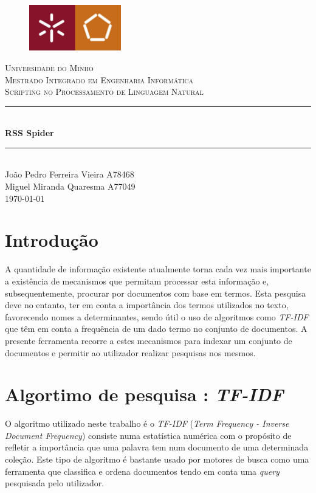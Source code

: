 \documentclass{article}
\newcommand{\titleRule}{
    \rule{\linewidth}{0.5mm} \\ [0.25cm]
}
\begin{document}
\begin{titlepage}
    \center
    \begin{figure}[H]
        \centering
        \includegraphics[width=4cm]{UM_EENG.jpg}
    \end{figure}
    \textsc{\LARGE Universidade do Minho} \\ [1.5cm]
    \textsc{\Large Mestrado Integrado em Engenharia Informática} \\ [0.5cm]
    \textsc{\large Scripting no Processamento de Linguagem Natural} \\ [0.5cm]

    \titleRule
    {\huge \bfseries RSS Spider}
    \titleRule

    João Pedro Ferreira Vieira A78468 \\
    Miguel Miranda Quaresma A77049 \\[0.25cm]

    \today
\end{titlepage}

\tableofcontents

\newpage

\section{Introdução}

A quantidade de informação existente atualmente torna cada vez mais importante a existência de mecanismos que permitam processar
esta informação e, subsequentemente, procurar por documentos com base em termos. Esta pesquisa deve no entanto, ter em conta a
importância dos termos utilizados no texto, favorecendo nomes a determinantes, sendo útil o uso de algoritmos como \emph{TF-IDF} que 
têm em conta a frequência de um dado termo no conjunto de documentos. 
A presente ferramenta recorre a estes mecanismos para indexar um conjunto de documentos e permitir ao utilizador realizar pesquisas
nos mesmos.

\section{Algortimo de pesquisa : \emph{TF-IDF}}

O algoritmo utilizado neste trabalho é o \emph{TF-IDF} (\emph{Term Frequency - Inverse Document Frequency}) consiste numa estatística numérica com o propósito de refletir a importância que uma palavra tem num documento de uma determinada coleção. Este tipo de algoritmo é bastante usado por motores de busca como uma ferramenta que classifica e ordena documentos tendo em conta uma \emph{query} pesquisada pelo utilizador.
\end{document}
